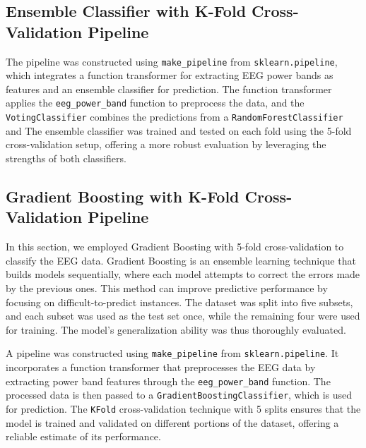 \subsection{Ensemble Classifier with K-Fold Cross-Validation Pipeline}

The pipeline was constructed using \texttt{make\_pipeline} from \texttt{sklearn.pipeline}, which integrates a function transformer for extracting EEG power bands as features and an ensemble classifier for prediction. The function transformer applies the \texttt{eeg\_power\_band} function to preprocess the data, and the \texttt{VotingClassifier} combines the predictions from a \texttt{RandomForestClassifier} and  The ensemble classifier was trained and tested on each fold using the 5-fold cross-validation setup, offering a more robust evaluation by leveraging the strengths of both classifiers.





\subsection{Gradient Boosting with K-Fold Cross-Validation Pipeline}
In this section, we employed Gradient Boosting with 5-fold cross-validation to classify the EEG data. Gradient Boosting is an ensemble learning technique that builds models sequentially, where each model attempts to correct the errors made by the previous ones. This method can improve predictive performance by focusing on difficult-to-predict instances. The dataset was split into five subsets, and each subset was used as the test set once, while the remaining four were used for training. The model's generalization ability was thus thoroughly evaluated.

A pipeline was constructed using \texttt{make\_pipeline} from \texttt{sklearn.pipeline}. It incorporates a function transformer that preprocesses the EEG data by extracting power band features through the \texttt{eeg\_power\_band} function. The processed data is then passed to a \texttt{GradientBoostingClassifier}, which is used for prediction. The \texttt{KFold} cross-validation technique with 5 splits ensures that the model is trained and validated on different portions of the dataset, offering a reliable estimate of its performance.












